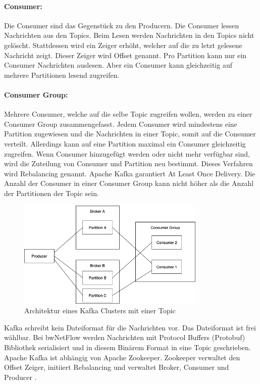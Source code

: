 \documentclass[a4paper, 12pt]{article}
\begin{document}
\paragraph{Consumer:} Die Consumer sind das Gegenstück zu den Producern. Die Consumer lessen Nachrichten aus den Topics. Beim Lesen werden Nachrichten in den Topics nicht gelöscht. Stattdessen wird ein Zeiger erhöht, welcher auf die zu letzt gelesene Nachricht zeigt. Dieser Zeiger wird Offset genannt. Pro Partition kann nur ein Consumer Nachrichten auslesen. Aber ein Consumer kann gleichzeitig auf mehrere Partitionen lesend zugreifen.
\paragraph{Consumer Group:} Mehrere Consumer, welche auf die selbe Topic zugreifen wollen, werden zu einer Consumer Group zusammengefasst. Jedem Consumer wird mindestens eine Partition zugewiesen und die Nachrichten in einer Topic, somit auf die Consumer verteilt. Allerdings kann auf eine Partition maximal ein Consumer gleichzeitig zugreifen. Wenn Consumer hinzugefügt werden oder nicht mehr verfügbar sind, wird die Zuteilung von Consumer und Partition neu bestimmt. Dieses Verfahren wird Rebalancing genannt. Apache Kafka garantiert At Least Once Delivery. Die Anzahl der Consumer in einer Consumer Group kann nicht höher als die Anzahl der Partitionen der Topic sein.
\\
\begin{figure}[H]
    \centering
    \includegraphics[width=0.8\textwidth]{images/kafka.png}
    \caption{Architektur eines Kafka Clusters mit einer Topic}
    \label{fig:kafkaarchitecture}
\end{figure}

Kafka schreibt kein Dateiformat für die Nachrichten vor. Das Dateiformat ist frei wählbar.
Bei bwNetFlow werden Nachrichten mit Protocol Buffers (Protobuf) Bibliothek serialisiert und in diesem Binärem Format in eine Topic geschrieben.
Apache Kafka ist abhängig von Apache Zookeeper. Zookeeper verwaltet den Offset Zeiger, initiiert Rebalancing und verwaltet Broker, Consumer und Producer \cite{kreps2011kafka}.
\end{document}
